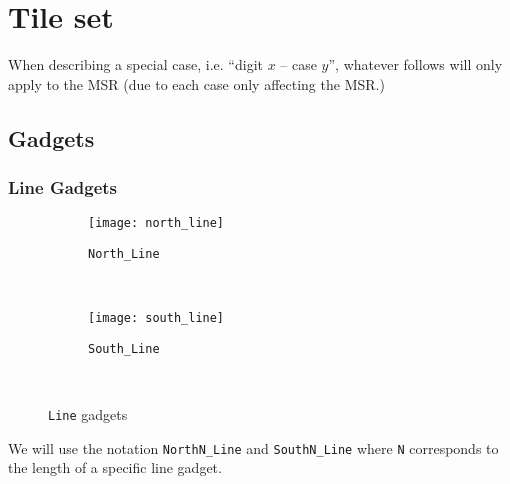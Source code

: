 \section{Tile set}
\label{gadgets}


\newcommand{\warpunit}{{\tt Warp\_Unit}}

\newcommand{\cread}{{\tt Counter\_Read}}
\newcommand{\prewarp}{{\tt Pre\_Warp}}
\newcommand{\firstwarp}{{\tt First\_Warp}}
\newcommand{\warpbridge}{{\tt Warp\_Bridge}}
\newcommand{\secondwarp}{{\tt Second\_Warp}}
\newcommand{\postwarp}{{\tt Post\_Warp}}
\newcommand{\cwrite}{{\tt Counter\_Write}}
\newcommand{\dtop}{{\tt Digit\_Top}}
\newcommand{\returnpath}{{\tt Return\_Path}}
\newcommand{\nextread}{{\tt Next\_Read}}
\newcommand{\crossnextrow}{{\tt Cross\_Next\_Row}}
\newcommand{\roofunit}{{\tt Roof\_Unit}}
\newcommand{\roofscaffolding}{{\tt Roof\_Scaffolding}}
\newcommand{\roofshingle}{{\tt Roof\_Shingle}}
\newcommand{\ops}{\{ {\tt increment}, {\tt copy}, {\tt halt} \}}

\newcommand{\inc}{ op}

When describing a special case, i.e. ``digit $x$ -- case $y$'', whatever follows
will only apply to the MSR (due to each case only affecting the MSR.)

\subsection{Gadgets}
\subsubsection{Line Gadgets}
\begin{figure}[H]
    \centering
    \begin{subfigure}[t]{0.15\textwidth}
        \centering
        \texttt{[image: north\_line]}
        \caption{\label{fig:north_line} {\tt North\_Line}}
    \end{subfigure}%
    ~
    \begin{subfigure}[t]{0.15\textwidth}
        \centering
        \texttt{[image: south\_line]}
        \caption{\label{fig:south_line} {\tt South\_Line} }
    \end{subfigure}%
    ~
    \caption{\label{fig:line_gadgets} {\tt Line} gadgets}
\end{figure}

We will use the notation {\tt NorthN\_Line} and {\tt SouthN\_Line} where {\tt N} corresponds to the length of a specific line gadget.

